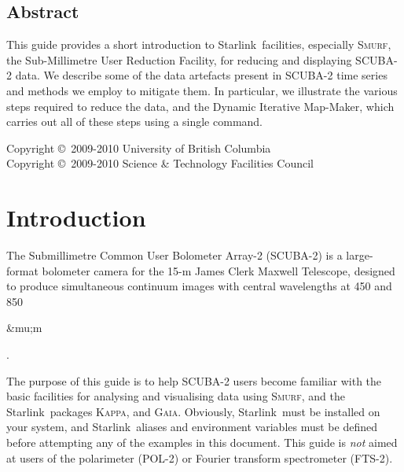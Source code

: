 \documentclass[twoside,11pt]{article}
\newcommand{\micron}{\mbox{\,${\umu}$m}}            %
\newcommand{\stardocinitials}  {SC}
\newcommand{\stardoccopyright}
{Copyright \copyright\ 2009-2010 University of British Columbia \\
 Copyright \copyright\ 2009-2010 Science \& Technology Facilities Council}
\newcommand{\stardocnumber}    {19.3}
\newcommand{\stardocabstract}  {

  This guide provides a short introduction to \starlink\ facilities,
  especially \smurf, the Sub-Millimetre User Reduction Facility, for
  reducing and displaying SCUBA-2 data. We describe some of the data
  artefacts present in SCUBA-2 time series and methods we employ to
  mitigate them. In particular, we illustrate the various steps
  required to reduce the data, and the Dynamic Iterative Map-Maker,
  which carries out all of these steps using a single command.}
\newcommand{\stardocname}{\stardocinitials /\stardocnumber}
\newcommand{\htmladdnormallink}[2]{#1}
\newenvironment{latexonly}{}{}
\newcommand{\xref}[3]{#1}
\newcommand{\xlabel}[1]{}
\renewcommand{\_}{\texttt{\symbol{95}}}
\newcommand{\starlink}{\htmladdnormallink{Starlink}{http://starlink.jach.hawaii.edu}}
\newcommand{\Kappa}{\xref{\textsc{Kappa}}{sun95}{}}
\newcommand{\gaia}{\xref{\textsc{Gaia}}{sun214}{}}
\newcommand{\smurf}{\xref{\textsc{Smurf}}{sun258}{}}
\renewcommand{\micron}{\begin{rawhtml}&mu;m\end{rawhtml}}
\renewcommand{\thepage}{\roman{page}}
\begin{document}
\begin{htmlonly}
  \section{\xlabel{abstract}Abstract}
\end{htmlonly}

\stardocabstract

\begin{latexonly}
\newpage
\vspace*{\fill}
\stardoccopyright
\end{latexonly}

  \newpage
  \begin{latexonly}
    \setlength{\parskip}{0mm}
    \tableofcontents
    \setlength{\parskip}{\medskipamount}
    \markboth{\stardocname}{\stardocname}
  \end{latexonly}

\cleardoublepage
\renewcommand{\thepage}{\arabic{page}}
\setcounter{page}{1}

\section{\xlabel{introduction}Introduction}
\label{sec:intro}

The Submillimetre Common User Bolometer Array-2 (SCUBA-2) is a
large-format bolometer camera for the 15-m James Clerk Maxwell
Telescope, designed to produce simultaneous continuum images with
central wavelengths at 450 and 850\micron.

The purpose of this guide is to help SCUBA-2 users become familiar
with the basic facilities for analysing and visualising data using
\smurf \cite{smurf}, and the \starlink\ packages \Kappa \cite{kappa},
and \gaia \cite{gaia}. Obviously, \starlink\ must be installed on your
system, and \starlink\ aliases and environment variables must be
defined before attempting any of the examples in this document.  This
guide is {\em not} aimed at users of the polarimeter (POL-2) or
Fourier transform spectrometer (FTS-2).
\end{document}
